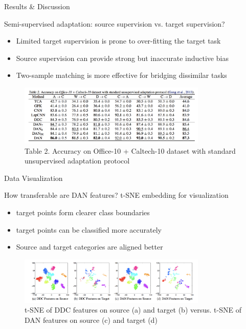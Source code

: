 \documentclass{beamer}
\begin{document}
\begin{frame}[fragile]{Results \& Discussion}
\begin{block}{Semi-supervised adaptation: source supervision vs. target supervision?}
\begin{itemize}
\item{Limited target supervision is prone to over-fitting the target task}
\item{Source supervision can provide strong but inaccurate inductive bias}
\item{Two-sample matching is more effective for bridging dissimilar tasks}
\end{itemize}
\end{block}
\begin{figure}[h]
    \centering
    \includegraphics[width=0.8\textwidth]{table2}
    \caption{Table 2. Accuracy on Office-10 + Caltech-10 dataset with standard unsupervised adaptation protocol }
    \label{fig:mesh2}
\end{figure}
\end{frame}

\begin{frame}[fragile]{Data Visualization}
\begin{block}{How transferable are DAN features? t-SNE embedding for visualization}
\begin{itemize}
\item{target points form clearer class boundaries}
\item{target points can be classified more accurately}
\item{Source and target categories are aligned better}
\end{itemize}
\end{block}
\begin{figure}[h]
    \centering
    \includegraphics[width=0.8\textwidth]{fig5}
    \caption{t-SNE of DDC features on source (a) and target (b) versus. t-SNE of DAN features on source (c) and target (d)}
    \label{fig:mesh2}
\end{figure}
\end{frame}
\end{document}
